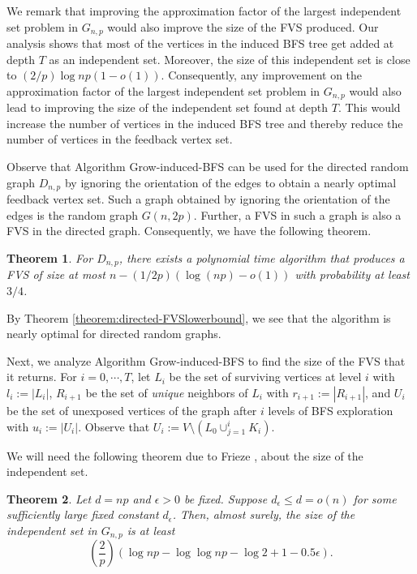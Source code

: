 \documentclass[11pt]{article}
\newtheorem{theorem}{Theorem}
\def\eps{\epsilon}
\begin{document}
We remark that improving the approximation factor of the largest independent set problem in $G_{n,p}$ would also improve the size of the FVS produced. Our analysis shows that most of the vertices in the induced BFS tree get added at depth $T$ as an independent set.
Moreover, the size of this independent set is close to $(2/p)\log{np}(1-o(1))$. Consequently, any improvement on the approximation factor of the largest independent set problem in $G_{n,p}$ would also lead to improving the size of the independent set found at depth $T$. This would increase the number of vertices in the induced BFS tree and thereby reduce the number of vertices in the feedback vertex set.

Observe that Algorithm Grow-induced-BFS can be used for the directed random graph $D_{n,p}$ by ignoring the orientation of the edges to obtain a nearly optimal feedback vertex set. Such a graph obtained by ignoring the orientation of the edges is the random graph $G(n,2p)$. Further, a FVS in such a graph is also a FVS in the directed graph. Consequently, we have the following theorem.
\begin{theorem}\label{directed-FVS}
For $D_{n,p}$, there exists a polynomial time algorithm that produces a FVS of size at most $n-(1/2p)(\log{(np)}-o(1))$ with probability at least $3/4$.
\end{theorem}
By Theorem \ref{theorem:directed-FVSlowerbound}, we see that the algorithm is nearly optimal for directed random graphs.

Next, we analyze Algorithm Grow-induced-BFS to find the size of the FVS that it returns. For $i=0,\cdots,T$, let
$L_i$ be the set of surviving vertices at level $i$ with $l_i:=|L_i|$,
$R_{i+1}$ be the set of \emph{unique} neighbors of $L_i$ with $r_{i+1}:=|R_{i+1}|$, and
$U_{i}$ be the set of unexposed vertices of the graph after $i$ levels of BFS exploration with $u_{i}:=|U_{i}|$. Observe that $U_i:=V\setminus (L_0\cup_{j=1}^{i} K_i)$.


We will need the following theorem due to Frieze \cite{frieze-ind-set}, about the size of the independent set.
\begin{theorem}\cite{frieze-ind-set} \label{theorem:large-ind-set}
Let $d=np$ and $\eps>0$ be fixed. Suppose $d_{\eps}\leq d=o(n)$ for some sufficiently large fixed constant $d_{\eps}$. Then, almost surely, the size of the independent set in $G_{n,p}$ is at least
\[
\left(\frac{2}{p}\right)(\log{np}-\log{\log{np}}-\log{2}+1-0.5\eps).
\]
\end{theorem}
\end{document}
